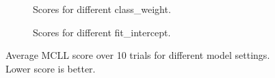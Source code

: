 \begin{figure}[ht]
    \centering
    \begin{subfigure}{.45\textwidth}
        \centering
        \captionsetup{width=0.9\linewidth}
        \captionsetup{justification=centering}
        \caption{Scores for different class\_weight.}
    \end{subfigure}
    \hspace{1cm}
    \begin{subfigure}{.45\textwidth}
        \centering
        \captionsetup{width=0.9\linewidth}
        \captionsetup{justification=centering}
        \caption{Scores for different fit\_intercept.}
    \end{subfigure}
    \captionsetup{width=0.8\linewidth}
    \captionsetup{justification=centering}
    \caption{Average MCLL score over 10 trials for different model settings. Lower score is better.}
    \label{fig:2-weightfit}
\end{figure}

